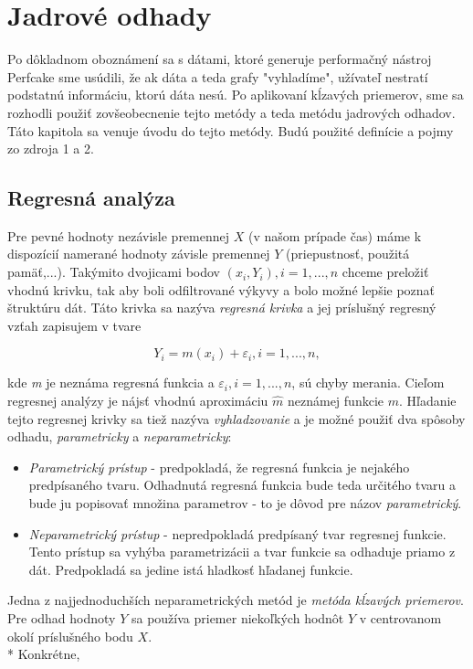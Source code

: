 \chapter{Jadrové odhady}

Po dôkladnom oboznámení sa s dátami, ktoré generuje performačný nástroj Perfcake sme usúdili, že ak dáta a teda grafy "vyhladíme", užívateľ nestratí podstatnú informáciu, ktorú dáta nesú. Po aplikovaní kĺzavých priemerov, sme sa rozhodli použiť zovšeobecnenie tejto metódy a teda metódu jadrových odhadov. Táto kapitola sa venuje úvodu do tejto metódy. Budú použité definície a pojmy zo zdroja 1 a 2.
\section{Regresná analýza}
Pre pevné hodnoty nezávisle premennej $X$ (v našom prípade čas)  máme k dispozícií namerané hodnoty závisle premennej $Y$ (priepustnosť, použitá pamäť,...). Takýmito dvojicami bodov $(x_i, Y_i), i = 1,...,n$ chceme preložiť vhodnú krivku, tak aby boli odfiltrované výkyvy a bolo možné lepšie poznať štruktúru dát. Táto krivka sa nazýva \textit{regresná krivka} a jej príslušný regresný vzťah zapisujem v tvare

\begin{equation}
Y_i = m(x_i) + \varepsilon _i, i=1,...,n,
\end{equation}

kde \textit{m} je neznáma regresná funkcia a $\varepsilon _i, i = 1,...,n$, sú chyby merania. Cieľom regresnej analýzy je nájsť vhodnú aproximáciu $\hat{m}$ neznámej funkcie $m$. Hľadanie tejto regresnej krivky sa tiež nazýva \textit{vyhladzovanie} a je možné použiť dva spôsoby odhadu, \textit{parametricky} a \textit{neparametricky}:
\begin{itemize}
\item \textit{Parametrický prístup} - predpokladá, že regresná funkcia je nejakého predpísaného tvaru. Odhadnutá regresná funkcia bude teda určitého tvaru a bude ju popisovať množina parametrov - to je dôvod pre názov \textit{parametrický}.
\item \textit{Neparametrický prístup} - nepredpokladá predpísaný tvar regresnej funkcie. Tento prístup sa vyhýba parametrizácii a tvar funkcie sa odhaduje priamo z dát. Predpokladá sa jedine istá hladkosť hľadanej funkcie.
\end{itemize}

Jedna z najjednoduchších neparametrických metód je \textit{ metóda kĺzavých priemerov}. Pre odhad hodnoty $Y$ sa používa priemer niekoľkých hodnôt $Y$ v centrovanom okolí príslušného bodu $X$. \\*
Konkrétne,
 

